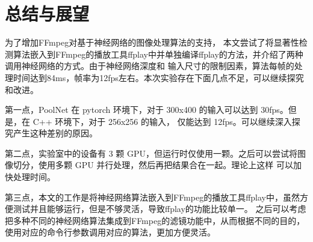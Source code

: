 \section{总结与展望}

为了增加FFmpeg对基于神经网络的图像处理算法的支持，
本文尝试了将显著性检测算法嵌入到FFmpeg的播放工具ffplay中并单独编译ffplay的方法，并介绍了两种调用神经网络的方式。由于神经网络深度和
输入尺寸的限制因素，算法每帧的处理时间达到84ms，帧率为12fps左右。本次实验存在下面几点不足，可以继续探究和改进。

第一点，PoolNet 在 pytorch 环境下，对于 300x400 的输入可以达到 30fps。但是，在 C++ 环境下，对于 256x256 的输入，
仅能达到 12fps。可以继续深入探究产生这种差别的原因。

第二点，实验室中的设备有 3 颗 GPU，但运行时仅使用一颗。之后可以尝试将图像切分，使用多颗 GPU 并行处理，然后再把结果合在一起。理论上这样
可以加快处理时间。

第三点，本文的工作是将神经网络算法嵌入到FFmpeg的播放工具ffplay中，虽然方便测试并且能够运行，但是不够灵活，导致ffplay的功能比较单一。
之后可以考虑把多种不同的神经网络算法集成到FFmpeg的滤镜功能中，从而根据不同的目的，使用对应的命令行参数调用对应的算法，更加方便灵活。